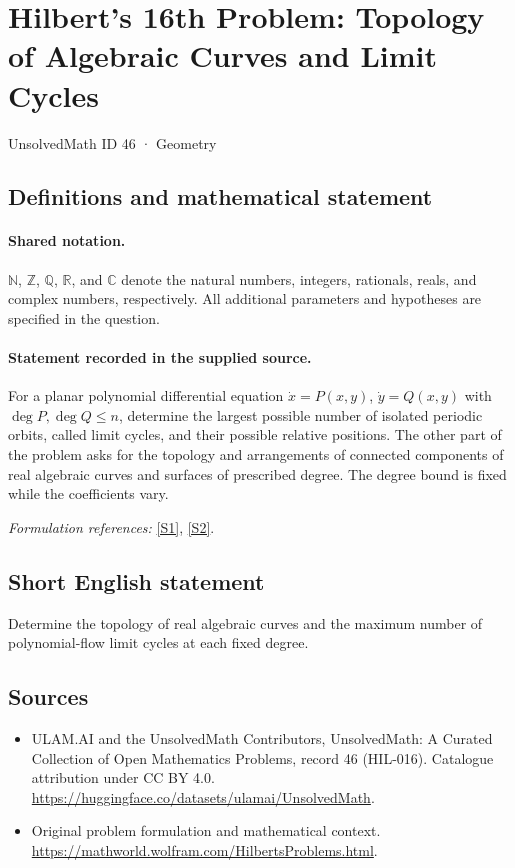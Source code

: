 \documentclass[11pt]{article}
\newcommand{\sref}[2]{\hyperlink{source:#1:#2}{[S#2]}}
\begin{document}
\setcounter{section}{45}
\section{Hilbert's 16th Problem: Topology of Algebraic Curves and Limit Cycles}\label{46}
{\small UnsolvedMath ID 46 · Geometry}
\subsection{Definitions and mathematical statement}

\paragraph{Shared notation.}$\mathbb N$, $\mathbb Z$, $\mathbb Q$, $\mathbb R$, and $\mathbb C$ denote the natural numbers, integers, rationals, reals, and complex numbers, respectively. All additional parameters and hypotheses are specified in the question.


\paragraph{Statement recorded in the supplied source.}
For a planar polynomial differential equation $\dot x=P(x,y)$, $\dot y=Q(x,y)$ with $\deg P,\deg Q\leq n$, determine the largest possible number of isolated periodic orbits, called limit cycles, and their possible relative positions. The other part of the problem asks for the topology and arrangements of connected components of real algebraic curves and surfaces of prescribed degree. The degree bound is fixed while the coefficients vary.
\par\smallskip\textit{Formulation references:} \sref{46}{1}, \sref{46}{2}.
\subsection{Short English statement}
Determine the topology of real algebraic curves and the maximum number of polynomial-flow limit cycles at each fixed degree.
\subsection{Sources}
\begin{itemize}
\item[\hypertarget{source:46:1}{S1}] ULAM.AI and the UnsolvedMath Contributors, UnsolvedMath: A Curated Collection of Open Mathematics Problems, record 46 (HIL-016). Catalogue attribution under CC BY 4.0.
\url{https://huggingface.co/datasets/ulamai/UnsolvedMath}.
\item[\hypertarget{source:46:2}{S2}] Original problem formulation and mathematical context.
\url{https://mathworld.wolfram.com/HilbertsProblems.html}.
\end{itemize}
\label{end:46}
\end{document}
